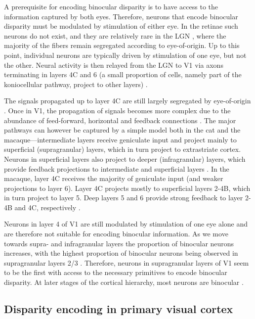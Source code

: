 A prerequisite for encoding binocular disparity is to have access to the information captured by both eyes. Therefore, neurons that encode binocular disparity must be modulated by stimulation of either eye. In the retinae such neurons do not exist, and they are relatively rare in the LGN \cite{Howarth:2014aa,Dougherty:2018aa}, where the majority of the fibers remain segregated according to eye-of-origin. Up to this point, individual neurons are typically driven by stimulation of one eye, but not the other. Neural activity is then relayed from the LGN to V1 via axons terminating in layers 4C and 6 (a small proportion of cells, namely part of the koniocellular pathway, project to other layers) \cite{Nassi:2009hd}.

The signals propagated up to layer 4C are still largely segregated by eye-of-origin \cite{Hubel:1968hz}. Once in V1, the propagation of signals becomes more complex due to the abundance of feed-forward, horizontal and feedback connections \cite{Callaway1998, Nassi:2009hd, Harris:2013vn}. The major pathways can however be captured by a simple model both in the cat and the macaque---intermediate layers receive geniculate input and project mainly to superficial (supragranular) layers, which in turn project to extrastriate cortex. Neurons in superficial layers also project to deeper (infragranular) layers, which provide feedback projections to intermediate and superficial layers \cite{Callaway1998}. In the macaque, layer 4C receives the majority of geniculate input (and weaker projections to layer 6). Layer 4C projects mostly to superficial layers 2-4B, which in turn project to layer 5. Deep layers 5 and 6 provide strong feedback to layer 2-4B and 4C, respectively \cite{Callaway1998}.

Neurons in layer 4 of V1 are still modulated by stimulation of one eye alone \cite{Hubel:1968hz} and are therefore not suitable for encoding binocular information. As we move towards supra- and infragranular layers the proportion of binocular neurons increases, with the highest proportion of binocular neurons being observed in supragranular layers 2/3 \cite{Hubel:1968hz, Poggio1972}. Therefore, neurons in supragranular layers of V1 seem to be the first with access to the necessary primitives to encode binocular disparity. At later stages of the cortical hierarchy, most neurons are binocular \cite{Burkhalter:1986fk, Maunsell:1987vn}.


\subsection{Disparity encoding in primary visual cortex}

